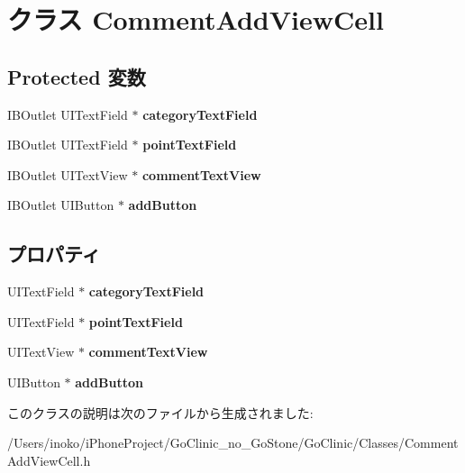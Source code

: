 \hypertarget{interface_comment_add_view_cell}{
\section{クラス CommentAddViewCell}
\label{interface_comment_add_view_cell}
}
\subsection*{Protected 変数}
\begin{DoxyCompactItemize}
\item 
\hypertarget{interface_comment_add_view_cell_aae3002da709f2016646fac4d2bc4e1c9}{
IBOutlet UITextField $\ast$ {\bfseries categoryTextField}}
\label{interface_comment_add_view_cell_aae3002da709f2016646fac4d2bc4e1c9}

\item 
\hypertarget{interface_comment_add_view_cell_a85c71177f9a45d87c5ca7bf339322261}{
IBOutlet UITextField $\ast$ {\bfseries pointTextField}}
\label{interface_comment_add_view_cell_a85c71177f9a45d87c5ca7bf339322261}

\item 
\hypertarget{interface_comment_add_view_cell_a697f2b062a2f518c84ea0b5918b128cf}{
IBOutlet UITextView $\ast$ {\bfseries commentTextView}}
\label{interface_comment_add_view_cell_a697f2b062a2f518c84ea0b5918b128cf}

\item 
\hypertarget{interface_comment_add_view_cell_a8580625445c9600ce790241aa5dae778}{
IBOutlet UIButton $\ast$ {\bfseries addButton}}
\label{interface_comment_add_view_cell_a8580625445c9600ce790241aa5dae778}

\end{DoxyCompactItemize}
\subsection*{プロパティ}
\begin{DoxyCompactItemize}
\item 
\hypertarget{interface_comment_add_view_cell_ac73ce68c06e264f6f38a82d8be6cac34}{
UITextField $\ast$ {\bfseries categoryTextField}}
\label{interface_comment_add_view_cell_ac73ce68c06e264f6f38a82d8be6cac34}

\item 
\hypertarget{interface_comment_add_view_cell_ab6b266265e3ee3658c01f7fc681d1ce9}{
UITextField $\ast$ {\bfseries pointTextField}}
\label{interface_comment_add_view_cell_ab6b266265e3ee3658c01f7fc681d1ce9}

\item 
\hypertarget{interface_comment_add_view_cell_ade91f1674e2bcc62f98ba29c14f61a1c}{
UITextView $\ast$ {\bfseries commentTextView}}
\label{interface_comment_add_view_cell_ade91f1674e2bcc62f98ba29c14f61a1c}

\item 
\hypertarget{interface_comment_add_view_cell_a3f06c6ae7c58ca4a1731ac85c3d38e8b}{
UIButton $\ast$ {\bfseries addButton}}
\label{interface_comment_add_view_cell_a3f06c6ae7c58ca4a1731ac85c3d38e8b}

\end{DoxyCompactItemize}


このクラスの説明は次のファイルから生成されました:\begin{DoxyCompactItemize}
\item 
/Users/inoko/iPhoneProject/GoClinic\_\-no\_\-GoStone/GoClinic/Classes/CommentAddViewCell.h\end{DoxyCompactItemize}
